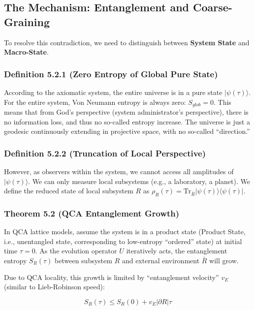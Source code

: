 \subsection{The Mechanism: Entanglement and Coarse-Graining}

To resolve this contradiction, we need to distinguish between \textbf{System State} and \textbf{Macro-State}.

\subsubsection{Definition 5.2.1 (Zero Entropy of Global Pure State)}

According to the axiomatic system, the entire universe is in a pure state $|\psi(\tau)\rangle$. For the entire system, Von Neumann entropy is always zero: $S_{glob} = 0$. This means that from God's perspective (system administrator's perspective), there is no information loss, and thus no so-called entropy increase. The universe is just a geodesic continuously extending in projective space, with no so-called ``direction.''

\subsubsection{Definition 5.2.2 (Truncation of Local Perspective)}

However, as observers within the system, we cannot access all amplitudes of $|\psi(\tau)\rangle$. We can only measure local subsystems (e.g., a laboratory, a planet). We define the reduced state of local subsystem $R$ as $\rho_R(\tau) = \text{Tr}_{\bar{R}} |\psi(\tau)\rangle\langle\psi(\tau)|$.

\subsubsection{Theorem 5.2 (QCA Entanglement Growth)}

In QCA lattice models, assume the system is in a product state (Product State, i.e., unentangled state, corresponding to low-entropy ``ordered'' state) at initial time $\tau=0$. As the evolution operator $U$ iteratively acts, the entanglement entropy $S_R(\tau)$ between subsystem $R$ and external environment $\bar{R}$ will grow.

Due to QCA locality, this growth is limited by ``entanglement velocity'' $v_E$ (similar to Lieb-Robinson speed):

$$S_R(\tau) \le S_R(0) + v_E |\partial R| \tau$$

